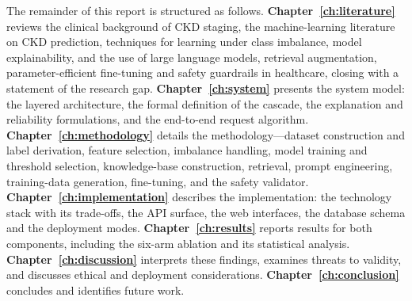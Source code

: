 The remainder of this report is structured as follows.
\textbf{Chapter~\ref{ch:literature}} reviews the clinical background of CKD
staging, the machine-learning literature on CKD prediction, techniques for
learning under class imbalance, model explainability, and the use of large
language models, retrieval augmentation, parameter-efficient fine-tuning and
safety guardrails in healthcare, closing with a statement of the research gap.
\textbf{Chapter~\ref{ch:system}} presents the system model: the layered
architecture, the formal definition of the cascade, the explanation and
reliability formulations, and the end-to-end request algorithm.
\textbf{Chapter~\ref{ch:methodology}} details the methodology---dataset
construction and label derivation, feature selection, imbalance handling, model
training and threshold selection, knowledge-base construction, retrieval,
prompt engineering, training-data generation, fine-tuning, and the safety
validator. \textbf{Chapter~\ref{ch:implementation}} describes the
implementation: the technology stack with its trade-offs, the API surface, the
web interfaces, the database schema and the deployment modes.
\textbf{Chapter~\ref{ch:results}} reports results for both components,
including the six-arm ablation and its statistical analysis.
\textbf{Chapter~\ref{ch:discussion}} interprets these findings, examines
threats to validity, and discusses ethical and deployment considerations.
\textbf{Chapter~\ref{ch:conclusion}} concludes and identifies future work.
